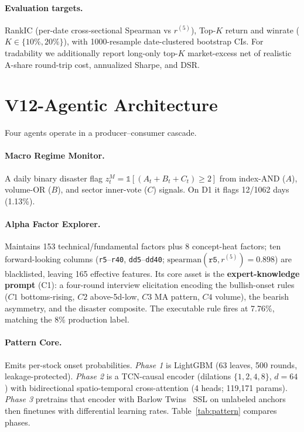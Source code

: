 \documentclass[sigconf,nonacm]{acmart}
\newcommand{\mt}[1]{\texttt{#1}}
\begin{document}
\paragraph{Evaluation targets.} RankIC (per-date cross-sectional Spearman vs
$r^{(5)}$), Top-$K$ return and winrate ($K\in\{10\%,20\%\}$), with 1000-resample
date-clustered bootstrap CIs. For tradability we additionally report long-only top-$K$
market-excess net of realistic A-share round-trip cost, annualized Sharpe, and DSR.

\section{V12-Agentic Architecture}\label{sec:arch}

Four agents operate in a producer--consumer cascade.

\paragraph{Macro Regime Monitor.} A daily binary disaster flag
$z^M_t=\mathbb{1}[(A_t+B_t+C_t)\ge 2]$ from index-AND ($A$), volume-OR ($B$), and
sector inner-vote ($C$) signals. On D1 it flags 12/1062 days (1.13\%).

\paragraph{Alpha Factor Explorer.} Maintains 153 technical/fundamental factors plus 8
concept-heat factors; ten forward-looking columns (\mt{r5}--\mt{r40},
\mt{dd5}--\mt{dd40}; $\mathrm{spearman}(\mt{r5},r^{(5)})=0.898$) are blacklisted,
leaving 165 effective features. Its core asset is the \textbf{expert-knowledge prompt}
(C1): a four-round interview elicitation encoding the bullish-onset rules
($C1$ bottoms-rising, $C2$ above-5d-low, $C3$ MA pattern, $C4$ volume), the bearish
asymmetry, and the disaster composite. The executable rule fires at 7.76\%, matching
the 8\% production label.

\paragraph{Pattern Core.} Emits per-stock onset probabilities. \emph{Phase 1} is
LightGBM (63 leaves, 500 rounds, leakage-protected). \emph{Phase 2} is a TCN-causal
encoder (dilations $\{1,2,4,8\}$, $d{=}64$) with bidirectional spatio-temporal
cross-attention (4 heads; 119{,}171 params). \emph{Phase 3} pretrains that encoder with
Barlow Twins~\cite{zbontar2021barlow} SSL on unlabeled anchors then finetunes with differential learning
rates. Table~\ref{tab:pattern} compares phases.
\end{document}
